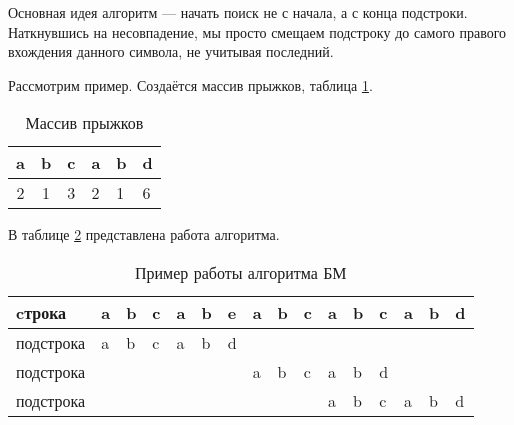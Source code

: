 \documentclass[a4paper,14pt]{extreport}
\begin{document}
Основная идея алгоритм — начать поиск не с начала, а с конца подстроки.
Наткнувшись на несовпадение, мы просто смещаем подстроку до самого правого вхождения данного символа, не учитывая последний.

Рассмотрим пример. Создаётся массив прыжков, таблица \ref{tbl:bm-shift-analysis}.

\begin{table}[!h]
	\begin{center}
		\begin{tabular}{|c|c|c|l|l|l|}
			\hline
			a & b & c & a & b & d \\ \hline
			2 & 1 & 3 & 2 & 1 & 6 \\ \hline
		\end{tabular}
	\end{center}
	\caption{Массив прыжков}
	\label{tbl:bm-shift-analysis}
\end{table}

В таблице \ref{tbl:bm-example-analysis} представлена работа алгоритма.

\begin{table}[!h]
	\begin{center}
		\begin{tabular}{|l|l|l|l|l|l|l|l|l|l|l|l|l|l|l|l|}
			\hline
			cтрока    & a & b & c & a & b & e                         & a & b & c & a                         & b                         & c                         & a                         & b                         & d                         \\ \hline
			подстрока & a & b & c & a & b & \cellcolor[HTML]{FE0000}d &   &   &   &                           &                           &                           &                           &                           &                           \\ \hline
			подстрока &   &   &   &   &   &                           & a & b & c & a                         & b                         & \cellcolor[HTML]{FE0000}d &                           &                           &                           \\ \hline
			подстрока &   &   &   &   &   &                           &   &   &   & \cellcolor[HTML]{34FF34}a & \cellcolor[HTML]{34FF34}b & \cellcolor[HTML]{34FF34}c & \cellcolor[HTML]{34FF34}a & \cellcolor[HTML]{34FF34}b & \cellcolor[HTML]{34FF34}d \\ \hline
		\end{tabular}
	\end{center}
	\caption{Пример работы алгоритма БМ}
	\label{tbl:bm-example-analysis}
\end{table}
\end{document}
